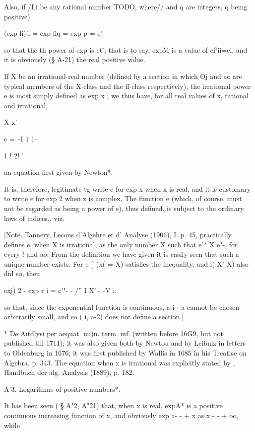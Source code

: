 Also, if /Li be any rational number TODO, where// and q are integers,
q being positive)

(exp fi)'i = exp fiq = exp p = e'\

so that the th power of exp is et'; that is to say, expM is a value
of ef'ii=ei, and it is obviously (§ A-21) the real positive value.

If X be an irrational-real number (defined by a section in which Oj
and ao are typical members of the X-class and the ff-class
respectively), the irrational power e is most simply defined as exp x
; we thus have, for all real values of x, rational and irrational,

X x'

e =\ -I 1 1-

1 ! 2! '

an equation first given by Newton*.

It is, therefore, legitimate tg write e for exp x when x is real, and
it is customary to write e for exp 2 when z is complex. The function e
(which, of course, must not be regarded as being a power of e), thus
defined, is subject to the ordinary laws of indices,, viz.

[Note. Tannery, Lecons d'Algehre et d' Analyse (1906), I. p. 45,
practically defines e, when X is irrational, as the only number X
such that e'* X e"-, for every ! and ao. From the definition we have
given it is easily seen that such a unique number exists. For e\ ] )x(
= X) satisfies the inequality, and i( X' X) also did so, then

exj) 2 - exp r i = c'"- - /'' I X' - -V i,

so that, since the exponential function is continuous, a-i - a cannot
be chosen arbitrarily small, and so ( i, a-2) does not define a
section.]

* De Aitdlysi per aequat. nu)n. term. inf. (written before 16G9, but
not published till 1711); it was also given both by Newtou and by
Leibniz in letters to Oldenburg in 1676; it was first published by
Wallis in 1685 in his Treatise on Algebra, p. 343. The equation when x
is irrational was explicitly stated by \Schlomilch, Handbuch der alg.
Analysis (1889), p. 182.

%
%

A'3. Logarithms of positive numbers*.

It has been seen ( § A"2, A"21) that, when x is real, expA* is a
positive continuous increasing function of x, and obviously exp a- - +
x as x - - + oo, while

